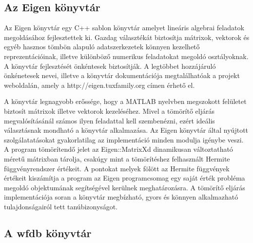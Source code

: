 \documentclass[oneside,titlepage,12pt,a4paper]{report}
\begin{document}
\subsection*{Az Eigen könyvtár}

Az Eigen könyvtár egy C++ sablon könyvtár amelyet lineáris algebrai feladatok megoldásához fejlesztettek ki. Gazdag választékát biztosítja mátrixok, vektorok és egyéb hasznos tömbön alapuló adatszerkezetek könnyen kezelhető reprezentációinak, illetve különböző numerikus feladatokat megoldó osztályoknak. A könyvtár fejlesztését önkéntesek biztosítják. A legtöbbet hozzájáruló önkénetesek nevei, illetve a könyvtár dokumentációja megtalálhatóak a projekt weboldalán, amely a http://eigen.tuxfamily.org címen érhető el.
\par A könyvtár legnagyobb erőssége, hogy a MATLAB nyelvben megszokott felületet biztosít mátrixok illetve vektorok kezeléséhez. Mivel a tömörítő eljárás megvalósításánál számos ilyen feladattal kell szembenézni, ezért ideális választásnak mondható a könyvtár alkalmazása. Az Eigen könyvtár által nyújtott szolgálatatásokat gyakorlatilag az implementáció minden modulja igénybe veszi. A program tömörítendő jelet az Eigen::MatrixXd dinamikusan változtatható méretű mátrixban tárolja, csakúgy mint a tömörítéshez felhasznált Hermite függvényrendszer értékeit. A pontokat melyek fölött az Hermite függvények értékeit kiszámítja a program az Eigen programcsomag egy saját érték probléma megoldó objektumának segítségével kerülnek meghatározásra. A tömörítő eljárás implementációja soran a könyvtár megbízható, gyors és könnyen alkalmazható tulajdonságairól tett tanúbizonyságot.

\subsection*{A wfdb könyvtár}
\end{document}
